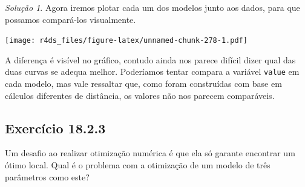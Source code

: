 \documentclass[
]{latex/krantz}
\newenvironment{Shaded}{\begin{snugshade}}{\end{snugshade}}
\newcommand{\AttributeTok}[1]{\textcolor[rgb]{0.13,0.29,0.53}{#1}}
\newcommand{\ControlFlowTok}[1]{\textcolor[rgb]{0.13,0.29,0.53}{\textbf{#1}}}
\newcommand{\DecValTok}[1]{\textcolor[rgb]{0.00,0.00,0.81}{#1}}
\newcommand{\FunctionTok}[1]{\textcolor[rgb]{0.13,0.29,0.53}{\textbf{#1}}}
\newcommand{\NormalTok}[1]{#1}
\newcommand{\OtherTok}[1]{\textcolor[rgb]{0.56,0.35,0.01}{#1}}
\newcommand{\SpecialCharTok}[1]{\textcolor[rgb]{0.81,0.36,0.00}{\textbf{#1}}}
\newcommand{\StringTok}[1]{\textcolor[rgb]{0.31,0.60,0.02}{#1}}
\theoremstyle{definition}
\theoremstyle{definition}
\theoremstyle{definition}
\theoremstyle{definition}
\theoremstyle{remark}
\newtheorem*{solution}{Solução}
\begin{document}
\begin{solution}
Agora iremos plotar cada um dos modelos junto aos dados, para que possamos compará-los visualmente.

\begin{Shaded}
\end{Shaded}

\texttt{[image: r4ds\_files/figure-latex/unnamed-chunk-278-1.pdf]}

A diferença é visível no gráfico, contudo ainda nos parece difícil dizer qual das duas curvas se adequa melhor. Poderíamos tentar compara a variável \texttt{value} em cada modelo, mas vale ressaltar que, como foram construídas com base em cálculos diferentes de distância, os valores não nos parecem comparáveis.
\end{solution}

\hypertarget{exr18-2-3}{%
\subsection*{Exercício 18.2.3}\label{exr18-2-3}}

Um desafio ao realizar otimização numérica é que ela só garante encontrar um ótimo local. Qual é o problema com a otimização de um modelo de três parâmetros como este?

\begin{Shaded}
\end{Shaded}
\end{document}
